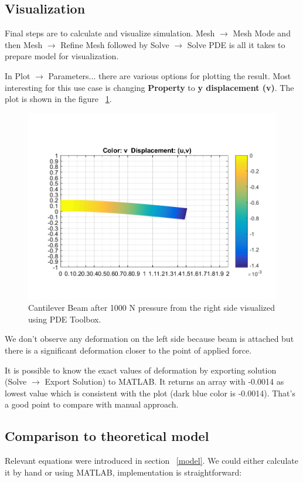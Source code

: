 \documentclass[12pt]{article}
\begin{document}
\subsection{Visualization}

Final steps are to calculate and visualize simulation. Mesh $\rightarrow$ Mesh Mode and then Mesh $\rightarrow$ Refine Mesh followed by Solve $\rightarrow$ Solve PDE is all it takes to prepare model for visualization.

In Plot $\rightarrow$ Parameters... there are various options for plotting the result. Most interesting for this use case is changing \textbf{Property} to \textbf{y displacement (v)}. The plot is shown in the figure ~\ref{4}.

\begin{figure}[H]
	\centering
	\includegraphics[width=\textwidth]{4}
	\caption{Cantilever Beam after 1000 N pressure from the right side visualized using PDE Toolbox.}
	\label{4}
\end{figure}

We don't observe any deformation on the left side because beam is attached but there is a significant deformation closer to the point of applied force.

It is possible to know the exact values of deformation by exporting solution (Solve $\rightarrow$ Export Solution) to MATLAB. It returns an array with -0.0014 as lowest value which is consistent with the plot (dark blue color is -0.0014). That's a good point to compare with manual approach.

\subsection{Comparison to theoretical model}
Relevant equations were introduced in section ~\ref{model}. We could either calculate it by hand or using MATLAB, implementation is straightforward:

\end{document}

